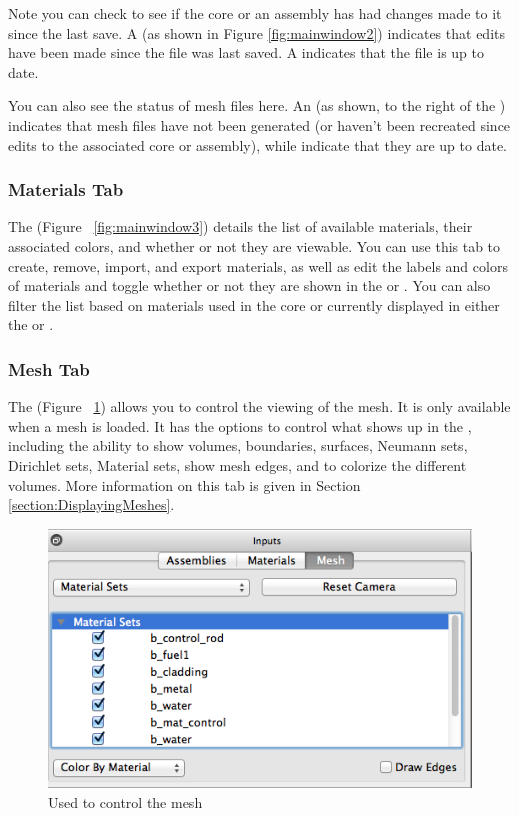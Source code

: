 Note you can check to see if the core or an assembly has had changes made to it since the last save.  A  (as shown in Figure \ref{fig:mainwindow2}) indicates that edits have been made since the file was last saved.  A  indicates that the file is up to date.

You can also see the status of mesh files here.  An  (as shown, to the right of the ) indicates that mesh files have not been generated (or haven't been recreated since edits to the associated core or assembly), while  indicate that they are up to date.

\subsubsection{Materials Tab}
The  (Figure ~\ref{fig:mainwindow3}) details the list of available materials, their associated colors, and whether or not they are viewable.  You can use this tab to create, remove, import, and export materials, as well as edit the labels and colors of materials and toggle whether or not they are shown in the  or .  You can also filter the list based on materials used in the core or currently displayed in either the  or .

\subsubsection{Mesh Tab}
The  (Figure ~\ref{fig:meshControl}) allows you to control the viewing of the mesh.  It is only available when a mesh is loaded.  It has the options to control what shows up in the , including the ability to show volumes, boundaries, surfaces, Neumann sets, Dirichlet sets, Material sets, show mesh edges, and to colorize the different volumes.  More information on this tab is given in Section \ref{section:DisplayingMeshes}.

\begin{figure}
	\begin{center}
		\includegraphics[width=0.9\linewidth]{Images/mash-tab.png}
		\caption{Used to control the mesh}
		\label{fig:meshControl}
	\end{center}
\end{figure}

